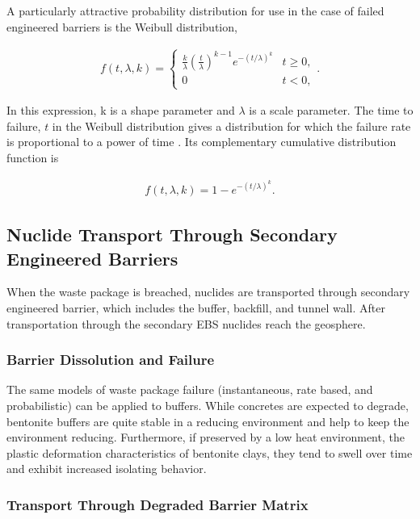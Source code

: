 {A particularly attractive probability distribution for use in the case of failed 
engineered barriers is the Weibull distribution, 

\begin{align}
  f(t,\lambda,k) =  \begin{cases}
    \frac{k}{\lambda}\left(\frac{t}{\lambda}\right)^{k-1}e^{-(t/\lambda)^{k}} & 
    t\geq0 ,\\
    0 & t<0 ,\end{cases}.
  \label{weibullpdf}
\end{align}


In this expression, k is a shape parameter and $\lambda$ is a scale
parameter. The time to failure, $t$ in the Weibull distribution gives a 
distribution for which the failure rate is proportional to a power of time 
\cite{papoulis_probability_2002}. Its complementary cumulative distribution
function is 

\begin{align}
  f(t,\lambda,k) = 1-e^{-(t/\lambda)^k}.
  \label{weibullcdf}
\end{align}



\subsection{Nuclide Transport Through Secondary Engineered Barriers}

When the waste package is breached, nuclides are transported through secondary 
engineered barrier, which includes the buffer, backfill, and tunnel wall. After 
transportation through the secondary EBS nuclides reach the geosphere. 

\subsubsection{Barrier Dissolution and Failure}

The same models of waste package failure (instantaneous, rate based, and 
probabilistic) can be applied to buffers. While concretes are expected to 
degrade, bentonite buffers are quite stable in a reducing environment and help 
to keep the environment reducing. Furthermore, if preserved by  a low heat 
environment, the plastic deformation characteristics of bentonite clays,
they tend to swell over time and exhibit increased isolating behavior.

\subsubsection{Transport Through Degraded Barrier Matrix}

}
